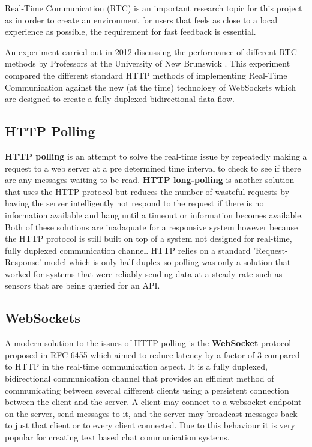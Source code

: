 Real-Time Communication (RTC) is an important research topic for this project as in order to create an environment for users that feels as close to a local experience as possible, the requirement for fast feedback is essential.

An experiment carried out in 2012 discussing the performance of different RTC methods by Professors at the University of New Brunswick \cite{websocket}. This experiment compared the different standard HTTP methods of implementing Real-Time Communication against the new (at the time) technology of WebSockets which are designed to create a fully duplexed bidirectional data-flow.

\subsection{HTTP Polling}

\textbf{HTTP polling} is an attempt to solve the real-time issue by repeatedly making a request to a web server at a pre determined time interval to check to see if there are any messages waiting to be read.  \textbf{HTTP long-polling} is another solution that uses the HTTP protocol but reduces the number of wasteful requests by having the server intelligently not respond to the request if there is no information available and hang until a timeout or information becomes available. Both of these solutions are inadaquate for a responsive system however because the HTTP protocol is still built on top of a system not designed for real-time, fully duplexed communication channel. HTTP relies on a standard 'Request-Response' model which is only half duplex so polling was only a solution that worked for systems that were reliably sending data at a steady rate such as sensors that are being queried for an API.

\subsection{WebSockets}

A modern solution to the issues of HTTP polling is the \textbf{WebSocket} protocol proposed in RFC 6455 \cite{wsrfc} which aimed to reduce latency by a factor of 3 compared to HTTP in the real-time communication aspect. It is a fully duplexed, bidirectional communication channel that provides an efficient method of communicating between several different clients using a persistent connection between the client and the server. A client may connect to a websocket endpoint on the server, send messages to it, and the server may broadcast messages back to just that client or to every client connected. Due to this behaviour it is very popular for creating text based chat communication systems.

